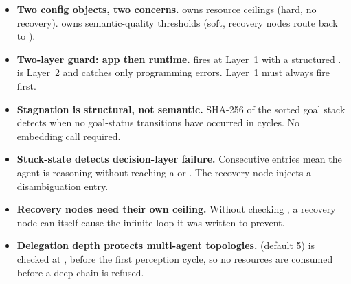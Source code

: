 \begin{takeawaybox}
\begin{itemize}
  \item \textbf{Two config objects, two concerns.}
         owns resource ceilings (hard, no
        recovery).   owns semantic-quality thresholds
        (soft, recovery nodes route back to ).

  \item \textbf{Two-layer guard: app then runtime.}
         fires at Layer~1 with a structured
        .   is Layer~2 and
        catches only programming errors.  Layer~1 must always fire first.

  \item \textbf{Stagnation is structural, not semantic.}
        SHA-256 of the sorted goal stack detects when no goal-status
        transitions have occurred in  cycles.
        No embedding call required.

  \item \textbf{Stuck-state detects decision-layer failure.}
        Consecutive  entries mean the agent
        is reasoning without reaching a  or
        .  The recovery node injects a
         disambiguation entry.

  \item \textbf{Recovery nodes need their own ceiling.}
        Without checking , a
        recovery node can itself cause the infinite loop it was written to
        prevent.

  \item \textbf{Delegation depth protects multi-agent topologies.}
         (default 5) is checked
        at , before the first perception cycle, so no
        resources are consumed before a deep chain is refused.
\end{itemize}
\end{takeawaybox}
